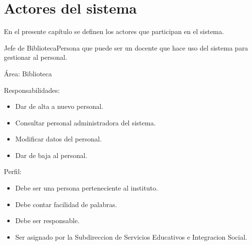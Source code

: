 
\chapter{Actores del sistema}
\label{chapter:ActoresDelSistema}

En el presente capítulo se definen los actores que participan en el sistema.

\begin{Actor}{Jefe de Biblioteca}{Persona que puede ser un docente que hace uso del sistema para gestionar al personal.}
	\item[Área:] Biblioteca
	\item[Responsabilidades:] \hspace{1pt}
	\begin{itemize}
		\item Dar de alta a nuevo personal.
		\item Consultar personal administradora del sistema.
		\item Modificar datos del personal.
		\item Dar de baja al personal.
	\end{itemize}
\item[Perfil:] \hspace{1pt}
	\begin{itemize}
		\item Debe ser una persona perteneciente al instituto.
		\item Debe contar facilidad de palabras.		
		\item Debe ser responsable.
		\item Ser asignado por la Subdireccion de Servicios Educativos e Integracion Social.
	\end{itemize}
\end{Actor}


